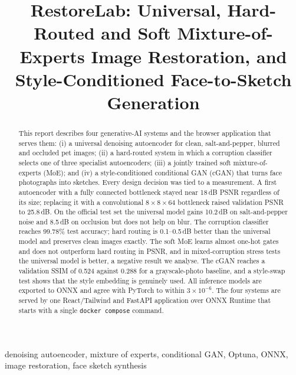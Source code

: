 \documentclass[conference]{IEEEtran}
\begin{document}
\title{RestoreLab: Universal, Hard-Routed and Soft Mixture-of-Experts Image Restoration, and Style-Conditioned Face-to-Sketch Generation}

\author{
}

\maketitle

\begin{abstract}
This report describes four generative-AI systems and the browser application that serves them: (i) a universal denoising autoencoder for clean, salt-and-pepper, blurred and occluded pet images; (ii) a hard-routed system in which a corruption classifier selects one of three specialist autoencoders; (iii) a jointly trained soft mixture-of-experts (MoE); and (iv) a style-conditioned conditional GAN (cGAN) that turns face photographs into sketches. Every design decision was tied to a measurement. A first autoencoder with a fully connected bottleneck stayed near 18\,dB PSNR regardless of its size; replacing it with a convolutional $8{\times}8{\times}64$ bottleneck raised validation PSNR to 25.8\,dB. On the official test set the universal model gains 10.2\,dB on salt-and-pepper noise and 8.5\,dB on occlusion but does not help on blur. The corruption classifier reaches 99.78\% test accuracy; hard routing is 0.1--0.5\,dB better than the universal model and preserves clean images exactly. The soft MoE learns almost one-hot gates and does not outperform hard routing in PSNR, and in mixed-corruption stress tests the universal model is better, a negative result we analyse. The cGAN reaches a validation SSIM of 0.524 against 0.288 for a grayscale-photo baseline, and a style-swap test shows that the style embedding is genuinely used. All inference models are exported to ONNX and agree with PyTorch to within $3\times10^{-6}$. The four systems are served by one React/Tailwind and FastAPI application over ONNX Runtime that starts with a single \texttt{docker compose} command.
\end{abstract}

\begin{IEEEkeywords}
denoising autoencoder, mixture of experts, conditional GAN, Optuna, ONNX, image restoration, face sketch synthesis
\end{IEEEkeywords}
\end{document}
